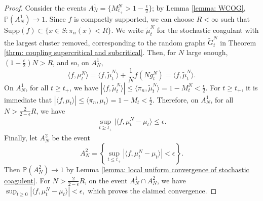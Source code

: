 \begin{proof}
Consider the events $
        A^1_N=\{M^N_{t_+}>1-\frac{\epsilon}{2} \}$; by Lemma \ref{lemma: WCOG}, $\mathbb{P}(A^1_N)\rightarrow 1$. Since $f$ is compactly supported, we can choose $R<\infty$ such that $\text{Supp}(f)\subset \{x\in S: \pi_n(x)<R\}$. We write $\widetilde{\mu}^N_t$ for the stochastic coagulant with the largest cluster removed, corresponding to the random graphs $\widetilde{G}^N_t$ in Theorem \ref{thrm: coupling supercritical and subcritical}. Then, for $N$ large enough, $(1-\frac{\epsilon}{2})N>R$, and so, on $A^1_N$, \begin{equation}
    \langle f,\mu^N_t\rangle = \langle f,\widetilde{\mu}^N_t\rangle+\frac{1}{N}f(Ng^N_t) =  \langle f,\widetilde{\mu}^N_t\rangle.
\end{equation}
On $A^1_N$, for all $t\ge t_+$, we have $|\langle f, \widetilde{\mu}^N_t\rangle | \le \langle \pi_n, \widetilde{\mu}^N_t\rangle = 1-M^N_t<\frac{\epsilon}{2}.$
For $t\geq t_+$, it is immediate that $|\langle f, \mu_t\rangle| \leq \langle \pi_n, \mu_t\rangle = 1-M_t <\frac{\epsilon}{2}.$
Therefore, on $A^1_N$, for all $N > \frac{2}{2-\epsilon}R$, we have \begin{equation} \begin{split}
    \sup_{t\ge t_+} |\langle f, \mu^N_t-\mu_t\rangle \le \epsilon.   \end{split}
\end{equation} Finally, let $A^2_N$ be the event \begin{equation}
    A^2_N=\left\{\sup_{t\leq t_+} |\langle f, \mu^N_t-\mu_t\rangle |<\epsilon\right\}.
\end{equation} Then $\mathbb{P}(A^2_N)\rightarrow 1$ by Lemma \ref{lemma: local uniform convergence of stochastic coagulent}. For $N > \frac{2}{2-\epsilon}R$, on the event $A^1_N\cap A^2_N$, we have $\sup_{t\geq 0} |\langle f, \mu^N_t-\mu_t\rangle |<\epsilon,$ which proves the claimed convergence.
\fi
\end{proof}